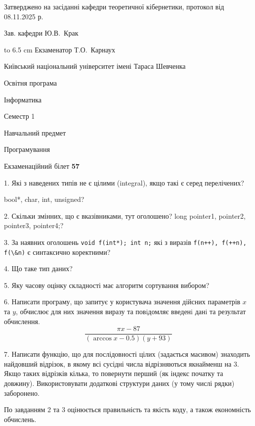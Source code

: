\documentclass[12pt, ukrainian]{article}
\def\code#1{\Verb!#1!}
\begin{document}
{\smallskip\smallskip \begin {scriptsize} Затверджено на засіданні кафедри теоретичної кібернетики, протокол   від   08.11.2025 р.\par\smallskip\smallskip\smallskip\smallskip
{\parbox {6.5 cm} {Зав. кафедри \dotfill Ю.В.~Крак}}\hspace {0.7cm} {\hbox to 6.5 cm { Екзаменатор \dotfill Т.О.~Карнаух}} \end{scriptsize}}
\newpage
{{\begin {scriptsize}\par
{ \center  Київський національний університет імені Тараса Шевченка \par}
{\parbox {5 cm}{Освітня програма \hfill}{\parbox {7 cm}{Інформатика\hfill}}\parbox {6 cm}{\hfill Семестр 1}}\par
{\parbox {5 cm} {Навчальний предмет \hfill}\parbox {7 cm}{Програмування \hfill}\parbox {6cm}{\hfill}\par}\vspace{-15pt} \end{scriptsize}}{\center Екзаменаційний білет \No \textbf { 57 }\par}}
{%
1. Які з наведених типів не є цілими (integral), якщо такі є серед перелічених?

bool*, char, int, unsigned?
\par
\vspace{2mm}
2. Скільки змінних, що є вказівниками, тут оголошено?
long pointer1, pointer2, pointer3, pointer4;?
\par
\vspace{2mm}
3. За наявних оголошень \code{void f(int*); int n;} які з виразів \code{f(n++), f(++n), f(\&n)} є синтаксично коректними?
\par
\vspace{2mm}
4. Що таке тип даних?
\par
\vspace{2mm}
5. Яку часову оцінку складності має алгоритм сортування вибором?
\par
\vspace{2mm}
6. Написати програму, що запитує у користувача значення дійсних параметрів $x$ та $y$, обчислює для них значення виразу та повiдомляє введенi данi та результат обчислення.
$$\frac{\pi x - 87}{(\arccos x - 0.5) (y + 93)}$$ 

\par
7. Написати функцію, що для послідовності цілих (задається масивом) знаходить найдовший відрізок, в якому всі сусідні числа відрізняються якнайменш на 3. Якщо таких відрізків кілька, то повернути перший (як індекс початку та довжину). Використовувати додаткові структури даних (у тому числі рядки) заборонено.

По завданням 2 та 3 оцінюється правильність та якість коду, а також економність обчислень.

}
\end{document}
